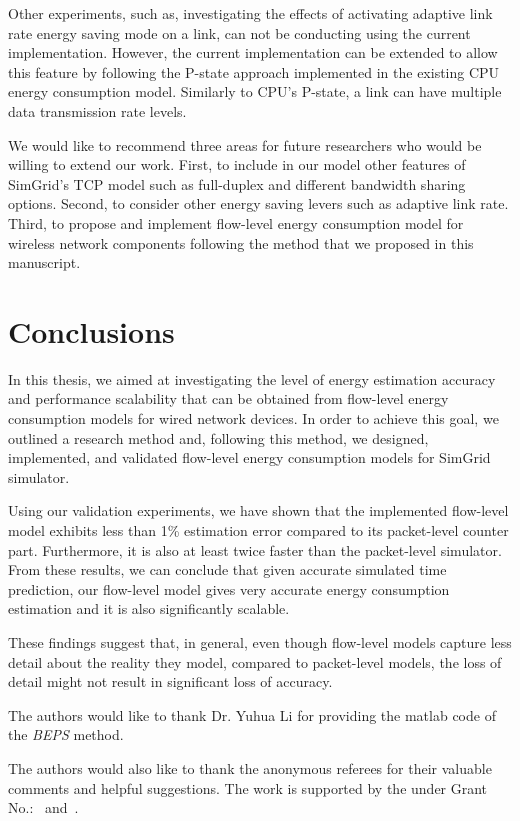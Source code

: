 Other experiments, such as, investigating the effects of activating adaptive link rate energy saving mode on a link, can not be conducting using the current implementation. However, the current implementation can be extended to allow this feature by following the P-state approach implemented in the existing CPU energy consumption model. Similarly to CPU's P-state, a link can have multiple data transmission rate levels. 

We would like to recommend three areas for future researchers who would be willing to extend our work. First, to include in our model other features of SimGrid's TCP model such as full-duplex and different bandwidth sharing options.  Second, to consider other energy saving levers such as adaptive link rate. Third, to propose and implement flow-level energy consumption model for wireless network components following the method that we proposed in this manuscript. 

\section{Conclusions}
In this thesis, we aimed at investigating the level of energy estimation accuracy and performance scalability that can be obtained from flow-level energy consumption models for wired network devices. In order to achieve this goal, we outlined a research method and, following this method, we designed, implemented, and validated flow-level energy consumption models for SimGrid simulator. 

Using our validation experiments, we have shown that the implemented flow-level model exhibits less than 1\% estimation error compared to its packet-level counter part. Furthermore, it is also at least twice faster than the packet-level simulator. From these results, we can conclude that given accurate simulated time prediction, our flow-level model gives very accurate energy consumption estimation and it is also significantly scalable. 

These findings suggest that, in general, even though flow-level models capture less detail about the reality they model, compared to packet-level models, the loss of detail might not result in significant loss of accuracy. 


\begin{acks}
  The authors would like to thank Dr. Yuhua Li for providing the
  matlab code of  the \textit{BEPS} method. 

  The authors would also like to thank the anonymous referees for
  their valuable comments and helpful suggestions. The work is
  supported by the  under Grant
  No.:~
  and~.

\end{acks}
